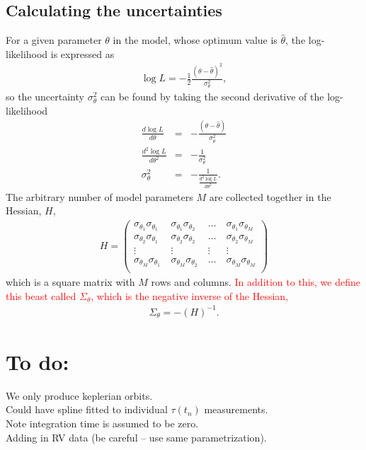 \documentclass[a4paper,fleqn,usenatbib]{mnras}
\newcommand{\red}{\textcolor{red} }
\begin{document}
\subsection{Calculating the uncertainties}

For a given parameter $\theta$ in the model, whose optimum value is $\hat \theta$, the log-likelihood is expressed as
\begin{eqnarray}
\log L = -\frac{1}{2}\frac{(\theta - \hat \theta)^2}{\sigma_{\theta}^2},
\end{eqnarray}
so the uncertainty $\sigma_{\theta}^2$ can be found by taking the second derivative of the log-likelihood
\begin{eqnarray}
\frac{d \log L}{d\theta} &=& -\frac{(\theta - \hat \theta)}{\sigma_{\theta}^2}\\
\frac{d^2 \log L}{d\theta^2} &=& -\frac{1}{\sigma_{\theta}^2}\\
\sigma_{\theta}^2 &=& -\frac{1}{\frac{d^2 \log L}{d\theta^2}}.
\label{eq:sigma}
\end{eqnarray}
The arbitrary number of model parameters $M$ are collected together in the Hessian, $H$,
\begin{eqnarray}
H = \left( \begin{array}{cccc}
	\sigma_{\theta_1}\sigma_{\theta_1}&~\sigma_{\theta_1}\sigma_{\theta_2}&~\dots&~\sigma_{\theta_1}\sigma_{\theta_M} \\
	\sigma_{\theta_2}\sigma_{\theta_1}&~\sigma_{\theta_2}\sigma_{\theta_2}&~\dots&~\sigma_{\theta_2}\sigma_{\theta_M} \\
	\vdots&~\vdots&~\vdots&~\vdots\\
	\sigma_{\theta_M}\sigma_{\theta_1}&~\sigma_{\theta_M}\sigma_{\theta_2}&~\dots&~\sigma_{\theta_M}\sigma_{\theta_M} \\
	\end{array}\right)
\label{eq:hessian}
\end{eqnarray}
which is a square matrix with $M$ rows and columns. \red{In addition to this, we define this beast called $\Sigma_{\theta}$, which is the negative inverse of the Hessian,}
\begin{eqnarray}
\Sigma_{\theta} = -(H)^{-1}.
\end{eqnarray}

\section{To do:}

We only produce keplerian orbits.\\
Could have spline fitted to individual $\tau(t_n)$ measurements.\\
Note integration time is assumed to be zero.\\
Adding in RV data (be careful -- use same parametrization).\\
\end{document}
